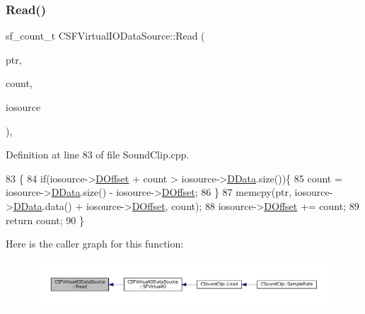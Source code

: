 \subsubsection{\texorpdfstring{Read()}{Read()}}
{\footnotesize\ttfamily sf\+\_\+count\+\_\+t C\+S\+F\+Virtual\+I\+O\+Data\+Source\+::\+Read (\begin{DoxyParamCaption}\item[{void $\ast$}]{ptr,  }\item[{sf\+\_\+count\+\_\+t}]{count,  }\item[{\hyperlink{classCSFVirtualIODataSource}{C\+S\+F\+Virtual\+I\+O\+Data\+Source} $\ast$}]{iosource }\end{DoxyParamCaption})\hspace{0.3cm}{\ttfamily [static]}, {\ttfamily [protected]}}



Definition at line 83 of file Sound\+Clip.\+cpp.


\begin{DoxyCode}
83                                                                                                     \{
84     \textcolor{keywordflow}{if}(iosource->\hyperlink{classCSFVirtualIODataSource_a29db7bf8a3a7103deacb80bf619919c8}{DOffset} + count > iosource->\hyperlink{classCSFVirtualIODataSource_ac03be5c46b6647150e12edc04fa52ede}{DData}.size())\{
85         count = iosource->\hyperlink{classCSFVirtualIODataSource_ac03be5c46b6647150e12edc04fa52ede}{DData}.size() - iosource->\hyperlink{classCSFVirtualIODataSource_a29db7bf8a3a7103deacb80bf619919c8}{DOffset};
86     \}
87     memcpy(ptr, iosource->\hyperlink{classCSFVirtualIODataSource_ac03be5c46b6647150e12edc04fa52ede}{DData}.data() + iosource->\hyperlink{classCSFVirtualIODataSource_a29db7bf8a3a7103deacb80bf619919c8}{DOffset}, count);
88     iosource->\hyperlink{classCSFVirtualIODataSource_a29db7bf8a3a7103deacb80bf619919c8}{DOffset} += count;
89     \textcolor{keywordflow}{return} count;
90 \}
\end{DoxyCode}
Here is the caller graph for this function\+:
\nopagebreak
\begin{figure}[H]
\begin{center}
\leavevmode
\includegraphics[width=350pt]{classCSFVirtualIODataSource_a40021962590f0911d8af1020397fbba1_icgraph}
\end{center}
\end{figure}
\hypertarget{classCSFVirtualIODataSource_a04735e135ffc05dd53fce944e772fcfc}{}\label{classCSFVirtualIODataSource_a04735e135ffc05dd53fce944e772fcfc} 
